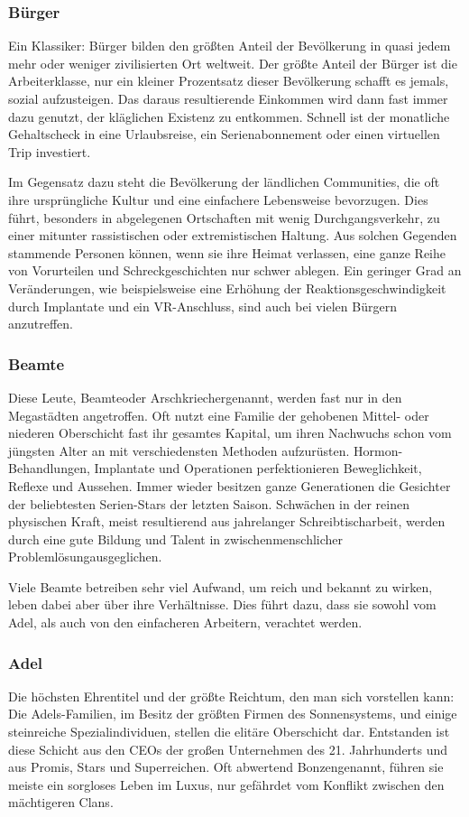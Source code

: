 \subsubsection{Bürger}
Ein Klassiker: Bürger bilden den größten Anteil der Bevölkerung in quasi jedem mehr oder weniger zivilisierten Ort weltweit. Der größte Anteil der Bürger ist die Arbeiterklasse, nur ein kleiner Prozentsatz dieser Bevölkerung schafft es jemals, sozial aufzusteigen. Das daraus resultierende Einkommen wird dann fast immer dazu genutzt, der kläglichen Existenz zu entkommen. Schnell ist der monatliche Gehaltscheck in eine Urlaubsreise, ein Serienabonnement oder einen virtuellen Trip investiert.

Im Gegensatz dazu steht die Bevölkerung der ländlichen Communities, die oft ihre ursprüngliche Kultur und eine einfachere Lebensweise bevorzugen. Dies führt, besonders in abgelegenen Ortschaften mit wenig Durchgangsverkehr, zu einer mitunter rassistischen oder extremistischen Haltung. Aus solchen Gegenden stammende Personen können, wenn sie ihre Heimat verlassen, eine ganze Reihe von Vorurteilen und Schreckgeschichten nur schwer ablegen. Ein geringer Grad an Veränderungen, wie beispielsweise eine Erhöhung der Reaktionsgeschwindigkeit durch Implantate und ein VR-Anschluss, sind auch bei vielen Bürgern anzutreffen.
\subsubsection{Beamte}
Diese Leute, \glqq Beamte\grqq oder \glqq Arschkriecher\grqq genannt, werden fast nur in den Megastädten angetroffen. Oft nutzt eine Familie der gehobenen Mittel- oder niederen Oberschicht fast ihr gesamtes Kapital, um ihren Nachwuchs schon vom jüngsten Alter an mit verschiedensten Methoden aufzurüsten. Hormon-Behandlungen, Implantate und Operationen perfektionieren Beweglichkeit, Reflexe und Aussehen. Immer wieder besitzen ganze Generationen die Gesichter der beliebtesten Serien-Stars der letzten Saison. Schwächen in der reinen physischen Kraft, meist resultierend aus jahrelanger Schreibtischarbeit, werden durch eine gute Bildung und Talent in \glqq zwischenmenschlicher Problemlösung\grqq  ausgeglichen.

Viele Beamte betreiben sehr viel Aufwand, um reich und bekannt zu wirken, leben dabei aber über ihre Verhältnisse. Dies führt dazu, dass sie sowohl vom Adel, als auch von den einfacheren Arbeitern, verachtet werden.
\subsubsection{Adel}
Die höchsten Ehrentitel und der größte Reichtum, den man sich vorstellen kann: Die Adels-Familien, im Besitz der größten Firmen des Sonnensystems, und einige steinreiche Spezialindividuen, stellen die elitäre Oberschicht dar. Entstanden ist diese Schicht aus den CEOs der großen Unternehmen des 21. Jahrhunderts und aus Promis, Stars und Superreichen. Oft abwertend \glqq Bonzen\grqq genannt, führen sie meiste ein sorgloses Leben im Luxus, nur gefährdet vom Konflikt zwischen den mächtigeren Clans.

